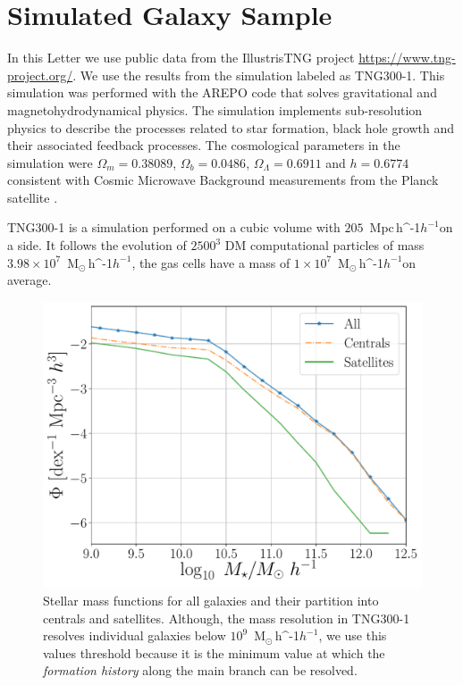 \documentclass[fleqn,usenatbib]{mnras}
\newcommand{\Msunh}{\,{\rm M}$_{\odot}$\,\ifmmode h^{-1}\else $h^{-1}$\fi}
\newcommand{\Mpch}{\,{\rm Mpc}\,\ifmmode h^{-1}\else $h^{-1}$\fi}
\begin{document}
\section{Simulated Galaxy Sample}
\label{sec:simul} %

In this Letter we use public data from the IllustrisTNG project
\url{https://www.tng-project.org/}. 
We use the results from the simulation labeled as TNG300-1.
This simulation was performed with the AREPO code
\citep{2018MNRAS.473.4077P} that solves gravitational and
magnetohydrodynamical physics.
The simulation implements sub-resolution physics to describe the
processes related to star formation, black hole growth and their
associated feedback processes.
The cosmological parameters in the simulation were $\Omega_m=0.38089$,
$\Omega_b=0.0486$, $\Omega_\Lambda= 0.6911$ and $h=0.6774$ consistent
with Cosmic Microwave Background measurements from the Planck satellite
\citep{2016A&A...594A..13P}.  

TNG300-1 is a simulation performed on a cubic volume
with  $205$ \Mpch on a side.
It follows the evolution of $2500^3$ DM computational particles of
mass $3.98 \times 10^7$ \Msunh, the gas cells have a mass of $1
\times 10^7$ \Msunh on average.



\begin{figure}
    \centering
    \includegraphics[width=1\columnwidth]{figuras/Histogramas.pdf}
    \caption{Stellar mass functions for all galaxies and their partition
      into centrals and satellites. 
    Although, the mass resolution in TNG300-1 resolves individual
    galaxies below $10^{9}$ \Msunh, we use this values threshold because
    it is the minimum value at which the \emph{formation history}
    along the main branch can be resolved.}
    \label{fig:stellar_fuction}
\end{figure}
\end{document}
